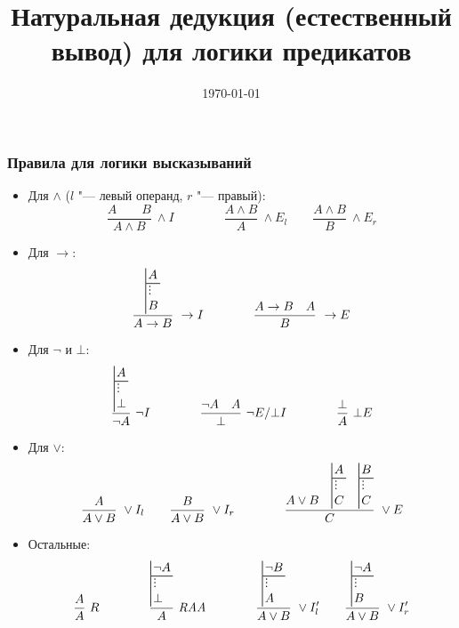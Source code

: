 \documentclass[10pt]{beamer}
\title{Натуральная дедукция (естественный вывод) для логики предикатов}
\date{\today}
\begin{document}
\begin{frame}[plain]
    \maketitle
\end{frame}

\begin{frame}
    \frametitle{Правила для логики высказываний}
    \scriptsize
    \setlength{\abovedisplayskip}{2pt}
    \setlength{\belowdisplayskip}{2pt}
    \setlength{\abovedisplayshortskip}{0pt}
    \setlength{\belowdisplayshortskip}{2pt}
    \begin{itemize}
        \item Для $\land$ ($l$ "--- левый операнд, $r$ "--- правый):
        \[
        \frac{A\qquad B}{A\land B}\ \land I
        \qquad\qquad
        \frac{A\land B}{A}\ \land E_l
        \qquad
        \frac{A\land B}{B}\ \land E_r
        \]
        \item Для $\to$:
        \[
        \frac{\ndsubproof{A}{B}}{A\to B}\ \to I
        \qquad\qquad
        \frac{A\to B\quad A}{B}\ \to E
        \]
        \item Для $\neg$ и $\bot$:
        \[
        \frac{\ndsubproof{A}{\bot}}{\neg A}\ \neg I
        \qquad\qquad
        \frac{\neg A\quad A}{\bot}\ \neg E/\bot I
        \qquad\qquad
        \frac{\bot}{A}\ \bot E
        \]
        \item Для $\lor$:
        \[
        \frac{A}{A\lor B}\ \lor I_l
        \qquad
        \frac{B}{A\lor B}\ \lor I_r
        \qquad\qquad
        \frac{A\lor B\quad\ndsubproof{A}{C}\quad\ndsubproof{B}{C}}{C}\ \lor E
        \]
        \item Остальные:
        \[
        \frac{A}{A}\ R
        \qquad\qquad
        \frac{\ndsubproof{\neg A}{\bot}}{A}\ \RAA
        \qquad\qquad
        \frac{\ndsubproof{\neg B}{A}}{A\lor B}\ \lor I'_l
        \qquad
        \frac{\ndsubproof{\neg A}{B}}{A\lor B}\ \lor I'_r
        \]
    \end{itemize}
\end{frame}
\end{document}
